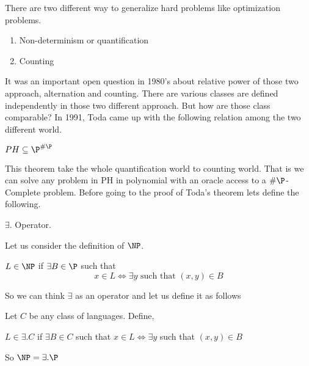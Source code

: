 \newcommand{\USAT}{{\sf USAT}}

There are two different way to generalize hard problems like optimization 
problems.
\begin{enumerate}
 \item Non-determinism or quantification
 \item Counting
\end{enumerate}

It was an important open question in 1980's about relative power of those 
two approach, alternation and counting. There are various 
classes are defined independently in those two different approach. But how 
are those class comparable? In 1991, Toda came up with the following relation 
among the two different world.

\begin{theorem}
 $PH \subseteq \P^{\#\P}$
\end{theorem}
This theorem take the whole quantification world to counting world. That is 
we can solve any problem in PH in polynomial with an oracle access to 
a $\#\P$-Complete problem. Before going to the proof of Toda's theorem lets 
define the following.

\begin{definition}
$\exists.$ Operator.

Let us consider the definition of $\NP$.
\begin{center}
$L \in \NP$ if $ \exists B \in \P$ such that 
\[ x \in L \Longleftrightarrow \exists y \text{ such that } (x,y) \in B \]
\end{center}
\end{definition}
So we can think $\exists$ as an operator and let us define it as follows

Let $C$ be any class of languages. Define, 
\begin{center}
$ L \in \exists.C$  if $\exists B \in C$  such that
$x \in L \Longleftrightarrow \exists y$ such that $(x,y) \in B$
\end{center}
So $\NP = \exists .\P$

